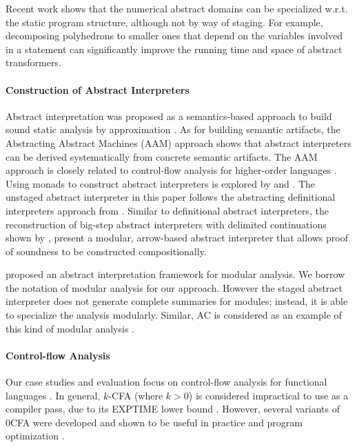 Recent work shows that the numerical abstract domains can be
specialized w.r.t. the static program structure, although not by
way of staging. For example, decomposing polyhedrons
\cite{DBLP:conf/popl/SinghPV17, Singh:2017:PCD:3177123.3158143} to
smaller ones that depend on the variables involved in a statement can
significantly improve the running time and space of abstract
transformers.

\paragraph{Construction of Abstract Interpreters} Abstract interpretation
was proposed as a semantics-based approach to build sound static analysis by
approximation \cite{DBLP:conf/popl/CousotC77}. As for building semantic
artifacts, the Abstracting Abstract Machines (AAM)
\cite{DBLP:journals/jfp/HornM12, DBLP:conf/icfp/HornM10} approach
shows that abstract interpreters can be derived systematically from
concrete semantic artifacts. The AAM approach is closely related to
control-flow analysis for higher-order languages
\cite{Midtgaard:2012:CAF:2187671.2187672}.  Using monads to construct
abstract interpreters is explored by
\citet{Sergey:2013:MAI:2491956.2491979} and
\citet{DBLP:journals/pacmpl/DaraisLNH17,
  Darais:2015:GTM:2814270.2814308}.  The unstaged abstract interpreter
in this paper follows the abstracting definitional interpreters
approach from \citet{DBLP:journals/pacmpl/DaraisLNH17}.  Similar to
definitional abstract interpreters,
the reconstruction of big-step abstract interpreters with delimited
continuations shown by \citet{Wei:2018:RAA:3243631.3236800},
\citet{Keidel:2018:CSP:3243631.3236767} present a modular, arrow-based
abstract interpreter that allows proof of soundness to be constructed
compositionally.

\citet{DBLP:conf/cc/CousotC02} proposed an abstract interpretation framework for
modular analysis. We borrow the notation of modular analysis for our approach.
However the staged abstract interpreter does not generate complete summaries for
modules; instead, it is able to specialize the analysis modularly. Similar, AC
is considered as an example of this kind of modular analysis \cite{DBLP:conf/cc/CousotC02}.

\paragraph{Control-flow Analysis} Our case studies and evaluation focus on
control-flow analysis for functional languages
\cite{Shivers:1991:SSC:115865.115884, Midtgaard:2012:CAF:2187671.2187672}. In
general, $k$-CFA (where $k > 0$) is considered impractical to use as a compiler
pass, due to its EXPTIME lower bound \cite{VanHorn:2008:DKC:1411204.1411243}.
However, several variants of 0CFA were developed and shown to be useful in
practice and program optimization \cite{Adams:2011:FTR:2048066.2048105,
Bergstrom:2014:PEH:2628136.2628153, ashley:practical, Reppy:2006:TCA:1159876.1159888}.

